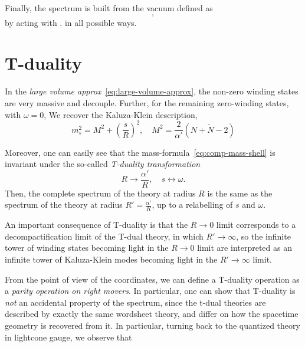 Finally, the spectrum is built from the vacuum defined as
\begin{equation}
    ,
\end{equation}
by acting with $.$ in all possible ways.


\section{T-duality}
In the \emph{large volume approx}~\eqref{eq:large-volume-approx}, the non-zero winding states are very massive and decouple. Further, for the remaining zero-winding states, with $\omega = 0$, We recover the Kaluza-Klein description,
\begin{equation}
    m_s^2 = M^2 + \left(\frac{s}{R}\right)^2, \quad M^2 = \frac{2}{\alpha'} (N + \tilde{N} - 2)
\end{equation}

Moreover, one can easily see that the mass-formula~\eqref{eq:comp-mass-shell} is invariant under the so-called \emph{T-duality transformation}
\begin{equation}
    R \to \frac{\alpha'}{R}, \quad s \leftrightarrow \omega .
\end{equation}
Then, the complete spectrum of the theory at radius $R$ is the same as the spectrum of the theory at radius $R' = \frac{\alpha'}{R}$, up to a relabelling of $s$ and $\omega$.

An important consequence of T-duality is that the $R \to 0$ limit corresponds to a decompactification limit of the T-dual theory, in which $R' \to \infty$, so the infinite tower of winding states becoming light in the $R \to 0$ limit are interpreted as an infinite tower of Kaluza-Klein modes becoming light in the $R' \to \infty$ limit.

From the point of view of the coordinates, we can define a T-duality operation as a \emph{parity operation on right movers}. In particular, one can show that T-duality is \emph{not} an accidental property of the spectrum, since the t-dual theories are described by exactly the same wordsheet theory, and differ on how the spacetime geometry is recovered from it. In particular, turning back to the quantized theory in lightcone gauge, we observe that 